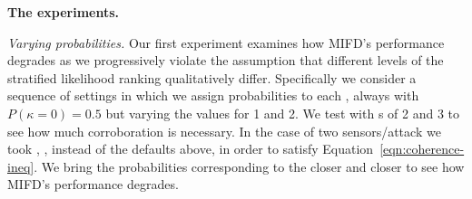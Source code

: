 
\textbf{The experiments.}

\emph{Varying probabilities.}
Our first experiment examines how MIFD's performance degrades as
we progressively violate the assumption that different levels of
the stratified likelihood ranking qualitatively differ.
Specifically we consider a sequence of settings in which we assign
probabilities to each \tkappa,
always with
$P(\kappa=0)=0.5$ but varying the values for 1 and 2.
We test with \sensorToAttackRatio{}s of 2 and 3 to see how much corroboration is
necessary.  In the case of two sensors/attack we took , , 
instead of the defaults above, in order to satisfy
Equation~\ref{eqn:coherence-ineq}.
We bring the probabilities corresponding to
the \tkappas closer and closer to see how MIFD's performance degrades.

